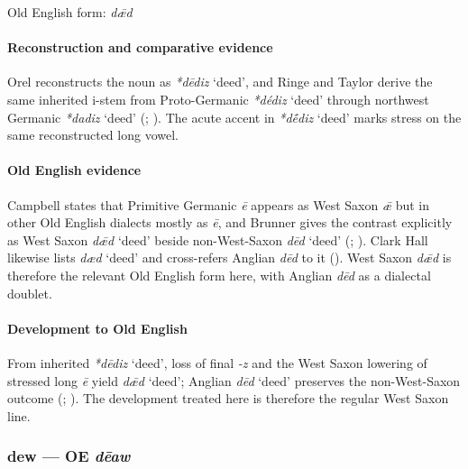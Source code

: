 \documentclass[
  british,
  a4paper,
]{article}
\providecommand{\Recon}[1]{\emph{*#1}}
\begin{document}
Old English form: \emph{dǣd}

\paragraph{Reconstruction and comparative
evidence}\label{reconstruction-and-comparative-evidence-13}

Orel reconstructs the noun as \Recon{dēdiz} `deed', and Ringe and Taylor
derive the same inherited i-stem from Proto-Germanic \Recon{dédiz}
`deed' through northwest Germanic \Recon{dadiz} `deed'
(;
). The acute accent
in \Recon{dḗdiz} `deed' marks stress on the same reconstructed long
vowel.

\paragraph{Old English evidence}\label{old-english-evidence-13}

Campbell states that Primitive Germanic \emph{ē} appears as West Saxon
\emph{ǣ} but in other Old English dialects mostly as \emph{ē}, and
Brunner gives the contrast explicitly as West Saxon \emph{dǣd} `deed'
beside non-West-Saxon \emph{dēd} `deed'
(;
). Clark Hall likewise
lists \emph{dæd} `deed' and cross-refers Anglian \emph{dēd} to it
(). West Saxon \emph{dǣd}
is therefore the relevant Old English form here, with Anglian \emph{dēd}
as a dialectal doublet.

\paragraph{Development to Old
English}\label{development-to-old-english-13}

From inherited \Recon{dēdiz} `deed', loss of final \emph{-z} and the
West Saxon lowering of stressed long \emph{ē} yield \emph{dǣd} `deed';
Anglian \emph{dēd} `deed' preserves the non-West-Saxon outcome
(;
). The development
treated here is therefore the regular West Saxon line.

\subsubsection{\texorpdfstring{dew --- OE
\emph{dēaw}}{dew --- OE dēaw}}\label{dew-oe-dux113aw}
\end{document}
